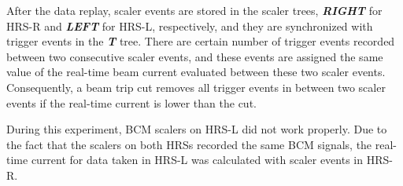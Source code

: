  After the data replay, scaler events are stored in the scaler trees, \emph{\bf{RIGHT}} for HRS-R and \emph{\bf{LEFT}} for HRS-L, respectively, and they are synchronized with trigger events in the \emph{\bf{T}} tree. There are certain number of trigger events recorded between two consecutive scaler events, and these events are assigned the same value of the real-time beam current evaluated between these two scaler events. Consequently, a beam trip cut removes all trigger events in between two scaler events if the real-time current is lower than the cut.

 During this experiment, BCM scalers on HRS-L did not work properly. Due to the fact that the scalers on both HRSs recorded the same BCM signals, the real-time current for data taken in HRS-L was calculated with scaler events in HRS-R.
